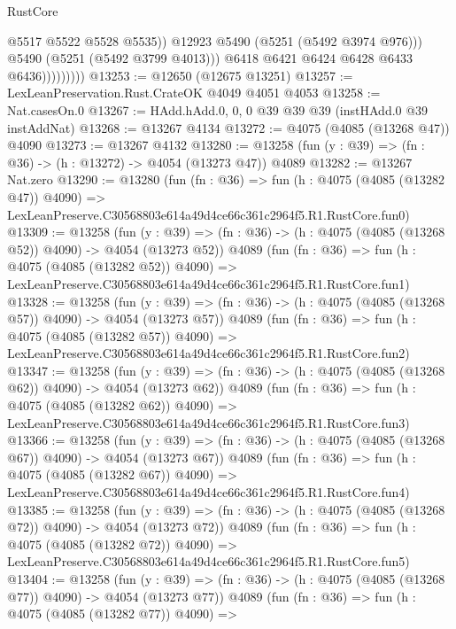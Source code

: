 \begin{lexlean}{RustCore}
\begin{coremodule}
                              @5517
                              @5522
                              @5528
                              @5535))
                          @12923
                          @5490
                          (@5251 (@5492 @3974 @976)))
                        @5490
                        (@5251 (@5492 @3799 @4013)))
                      @6418
                      @6421
                      @6424
                      @6428
                      @6433
                      @6436)))))))))
@13253 := @12650 (@12675 @13251)
@13257 := LexLeanPreservation.Rust.CrateOK @4049 @4051 @4053
@13258 := Nat.casesOn.{0}
@13267 := HAdd.hAdd.{0, 0, 0} @39 @39 @39 (instHAdd.{0} @39 instAddNat)
@13268 := @13267 @4134
@13272 := @4075 (@4085 (@13268 @47)) @4090
@13273 := @13267 @4132
@13280 := @13258 (fun (y : @39) => (fn : @36) -> (h : @13272) -> @4054 (@13273 @47)) @4089
@13282 := @13267 Nat.zero
@13290 := @13280
    (fun (fn : @36) =>
    fun (h : @4075 (@4085 (@13282 @47)) @4090) =>
    LexLeanPreserve.C30568803e614a49d4ce66c361c2964f5.R1.RustCore.fun0)
@13309 := @13258
    (fun (y : @39) => (fn : @36) -> (h : @4075 (@4085 (@13268 @52)) @4090) -> @4054 (@13273 @52))
    @4089
    (fun (fn : @36) =>
    fun (h : @4075 (@4085 (@13282 @52)) @4090) =>
    LexLeanPreserve.C30568803e614a49d4ce66c361c2964f5.R1.RustCore.fun1)
@13328 := @13258
    (fun (y : @39) => (fn : @36) -> (h : @4075 (@4085 (@13268 @57)) @4090) -> @4054 (@13273 @57))
    @4089
    (fun (fn : @36) =>
    fun (h : @4075 (@4085 (@13282 @57)) @4090) =>
    LexLeanPreserve.C30568803e614a49d4ce66c361c2964f5.R1.RustCore.fun2)
@13347 := @13258
    (fun (y : @39) => (fn : @36) -> (h : @4075 (@4085 (@13268 @62)) @4090) -> @4054 (@13273 @62))
    @4089
    (fun (fn : @36) =>
    fun (h : @4075 (@4085 (@13282 @62)) @4090) =>
    LexLeanPreserve.C30568803e614a49d4ce66c361c2964f5.R1.RustCore.fun3)
@13366 := @13258
    (fun (y : @39) => (fn : @36) -> (h : @4075 (@4085 (@13268 @67)) @4090) -> @4054 (@13273 @67))
    @4089
    (fun (fn : @36) =>
    fun (h : @4075 (@4085 (@13282 @67)) @4090) =>
    LexLeanPreserve.C30568803e614a49d4ce66c361c2964f5.R1.RustCore.fun4)
@13385 := @13258
    (fun (y : @39) => (fn : @36) -> (h : @4075 (@4085 (@13268 @72)) @4090) -> @4054 (@13273 @72))
    @4089
    (fun (fn : @36) =>
    fun (h : @4075 (@4085 (@13282 @72)) @4090) =>
    LexLeanPreserve.C30568803e614a49d4ce66c361c2964f5.R1.RustCore.fun5)
@13404 := @13258
    (fun (y : @39) => (fn : @36) -> (h : @4075 (@4085 (@13268 @77)) @4090) -> @4054 (@13273 @77))
    @4089
    (fun (fn : @36) =>
    fun (h : @4075 (@4085 (@13282 @77)) @4090) =>

\end{coremodule}
\end{lexlean}
